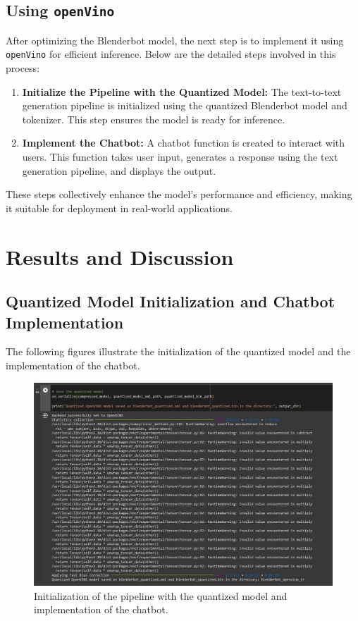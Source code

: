 \documentclass{josis}
\begin{document}
\subsection{Using \texttt{openVino}}
After optimizing the Blenderbot model, the next step is to implement it using \texttt{openVino} for efficient inference. Below are the detailed steps involved in this process:

\begin{enumerate}
    \item \textbf{Initialize the Pipeline with the Quantized Model:} The text-to-text generation pipeline is initialized using the quantized Blenderbot model and tokenizer. This step ensures the model is ready for inference.

    \item \textbf{Implement the Chatbot:} A chatbot function is created to interact with users. This function takes user input, generates a response using the text generation pipeline, and displays the output.

\end{enumerate}

These steps collectively enhance the model's performance and efficiency, making it suitable for deployment in real-world applications.


\section{Results and Discussion}
\subsection{Quantized Model Initialization and Chatbot Implementation}

The following figures illustrate the initialization of the quantized model and the implementation of the chatbot.

\begin{figure}[h]
    \centering
    \includegraphics[scale=0.38]{1i.jpg}
    \caption{Initialization of the pipeline with the quantized model and implementation of the chatbot.}
    \label{fig:chatbot_implementation}
\end{figure}
\end{document}
